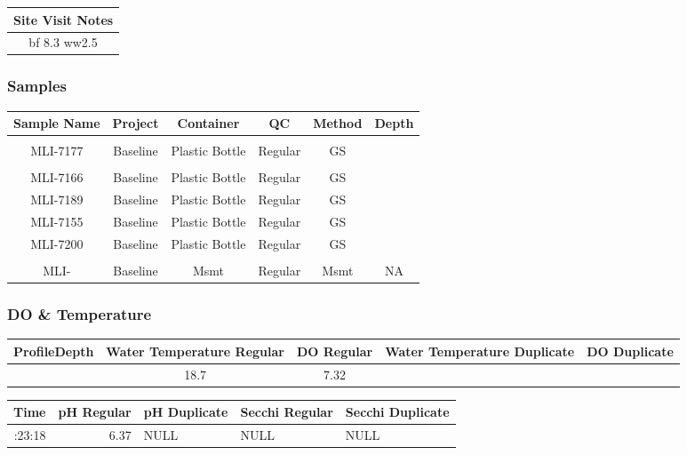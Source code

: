 \documentclass[
  letterpaper,
  DIV=11,
  numbers=noendperiod]{scrartcl}
\begin{document}
\begin{longtable*}{c}
\toprule
Site Visit Notes \\ 
\midrule\addlinespace[2.5pt]
bf 8.3
ww2.5 \\ 
\bottomrule
\end{longtable*}

\subsubsection{Samples}

\begin{longtable*}{cccccc}
\toprule
Sample Name & Project & Container & QC & Method & Depth \\ 
\midrule\addlinespace[2.5pt]
 \\ 
\midrule\addlinespace[2.5pt]
MLI-7177 & Baseline & Plastic Bottle & Regular & GS &  \\ 
\midrule\addlinespace[2.5pt]
 \\ 
\midrule\addlinespace[2.5pt]
MLI-7166 & Baseline & Plastic Bottle & Regular & GS &  \\ 
MLI-7189 & Baseline & Plastic Bottle & Regular & GS &  \\ 
MLI-7155 & Baseline & Plastic Bottle & Regular & GS &  \\ 
MLI-7200 & Baseline & Plastic Bottle & Regular & GS &  \\ 
\midrule\addlinespace[2.5pt]
 \\ 
\midrule\addlinespace[2.5pt]
MLI- & Baseline & Msmt & Regular & Msmt & NA \\ 
\bottomrule
\end{longtable*}

\subsubsection{DO \& Temperature}

\begin{longtable*}{rcccc}
\toprule
ProfileDepth & Water Temperature Regular & DO Regular & Water Temperature Duplicate & DO Duplicate \\ 
\midrule{} & 18.7 & 7.32 &  &  \\ 
\bottomrule
\end{longtable*}

\begin{longtable*}{rrlll}
\toprule
Time & pH Regular & pH Duplicate & Secchi Regular & Secchi Duplicate \\ 
\midrule{}:23:18 & 6.37 & NULL & NULL & NULL \\ 
\bottomrule
\end{longtable*}
\end{document}
